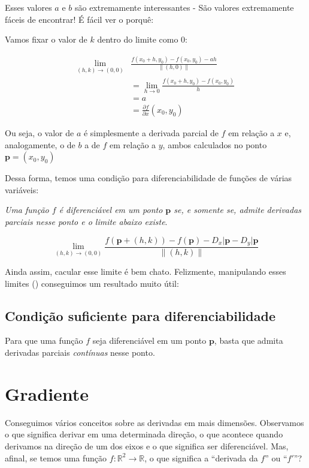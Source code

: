 \documentclass[
  letterpaper,
  DIV=11,
  numbers=noendperiod]{scrreprt}
\begin{document}
Esses valores \(a\) e \(b\) são extremamente interessantes - São valores
extremamente fáceis de encontrar! É fácil ver o porquê:

Vamos fixar o valor de \(k\) dentro do limite como \(0\):

\[
\begin{aligned}
  \lim_{(h,k) \rightarrow (0,0)} &\frac{f(x_0+h, y_0) - f(x_0,y_0) - ah}{\lVert (h,0) \rVert} \\
  &= \lim_{h \rightarrow 0} \frac{f(x_0+h,y_0) - f(x_0,y_0)}{h} \\
  &= a \\
  &= \frac{\partial f}{\partial x} (x_0,y_0)
\end{aligned}
\]

Ou seja, o valor de \(a\) é simplesmente a derivada parcial de \(f\) em
relação a \(x\) e, analogamente, o de \(b\) a de \(f\) em relação a
\(y\), ambos calculados no ponto \(\pmb{p} = (x_0,y_0)\)

Dessa forma, temos uma condição para diferenciabilidade de funções de
várias variáveis:

\emph{Uma função \(f\) é diferenciável em um ponto \(\pmb{p}\) se, e
somente se, admite derivadas parciais nesse ponto e o limite abaixo
existe}.

\[
\lim_{(h,k) \rightarrow (0,0)}
\frac{f(\pmb{p} + (h,k)) - f(\pmb{p}) - D_x\rvert{\pmb{p}} - D_y\rvert{\pmb{p}}}{\lVert (h,k) \rVert}
\]

Ainda assim, cacular esse limite é bem chato. Felizmente, manipulando
esses limites (\textcite{guidorizzi_um_2018}) conseguimos um resultado
muito útil:

\subsection{Condição suficiente para
diferenciabilidade}\label{condiuxe7uxe3o-suficiente-para-diferenciabilidade}

Para que uma função \(f\) seja diferenciável em um ponto \(\pmb{p}\),
basta que admita derivadas parciais \emph{contínuas} nesse ponto.

\section{Gradiente}\label{gradiente}

Conseguimos vários conceitos sobre as derivadas em mais dimensões.
Observamos o que significa derivar em uma determinada direção, o que
acontece quando derivamos na direção de um dos eixos e o que significa
ser diferenciável. Mas, afinal, se temos uma função
\(f : \mathbb{R}^2 \rightarrow \mathbb{R}\), o que significa a
``derivada da \(f\)'' ou ``\(f'\)''?
\end{document}
